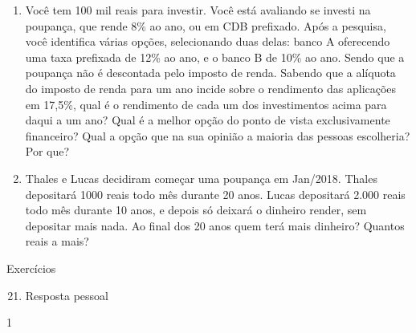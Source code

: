 \begin{enumerate}
\item Você tem 100 mil reais para investir. Você está avaliando se investi na poupança, que rende 8\% ao ano, ou em CDB prefixado. Após a pesquisa, você identifica várias opções, selecionando duas delas: banco A oferecendo uma taxa prefixada de 12\% ao ano, e o banco B de 10\% ao ano. Sendo que a poupança não é descontada pelo imposto de renda. Sabendo que a alíquota do imposto de renda para um ano incide sobre o rendimento das aplicações em 17,5\%, qual é o rendimento de cada um dos investimentos acima para daqui a um ano? Qual é a melhor opção do ponto de vista exclusivamente financeiro? Qual a opção que na sua opinião a maioria das pessoas escolheria? Por que?

\item Thales e Lucas decidiram começar uma poupança em Jan/2018. Thales depositará 1000 reais todo mês durante 20 anos. Lucas depositará 2.000 reais todo mês durante 10 anos, e depois só deixará o dinheiro render, sem depositar mais nada. Ao final dos 20 anos quem terá mais dinheiro? Quantos reais a mais?
\end{enumerate}
\clearpage
\begin{resposta}{Exercícios}
{
  \begin{enumerate}\setcounter{enumi}{20}
    \item Resposta pessoal
  \end{enumerate}
}{1}
\end{resposta}

